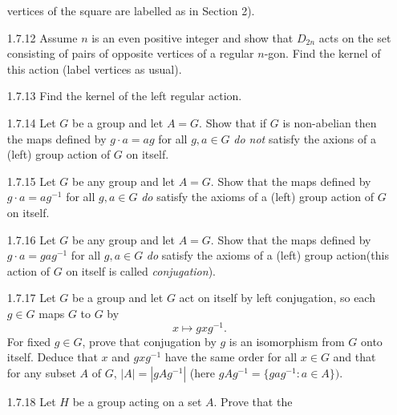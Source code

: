 \begin{enumerate}
                  vertices of the square are labelled as in Section 2).
   \item[1.7.12]  Assume $n$ is an even positive integer and show that $D_{2n}$
                  acts on the set consisting of pairs of opposite vertices of a
                  regular $n$-gon. Find the kernel of this action (label
                  vertices as usual).
   \item[1.7.13]  Find the kernel of the left regular action.
   \item[1.7.14]  Let $G$ be a group and let $A = G$. Show that if $G$ is
                  non-abelian then the maps defined by $g \cdot a = ag$ for all
                  $g, a \in G$ \textit{do not} satisfy the axions of a (left)
                  group action of $G$ on itself.
   \item[1.7.15]  Let $G$ be any group and let $A = G$. Show that the maps
                  defined by $g \cdot a = ag^{-1}$ for all $g, a \in G$
                  \textit{do} satisfy the axioms of a (left) group action of $G$
                  on itself.
   \item[1.7.16]  Let $G$ be any group and let $A = G$. Show that the maps
                  defined by $g \cdot a = gag^{-1}$ for all $g, a \in G$
                  \textit{do} satisfy the axioms of a (left) group action(this
                  action of $G$ on itself is called \textit{conjugation}).
   \item[1.7.17]  Let $G$ be a group and let $G$ act on itself by left 
                  conjugation, so each $g \in G$ maps $G$ to $G$ by
                  $$x \mapsto gxg^{-1}.$$
                  For fixed $g \in G$, prove that conjugation by $g$ is an
                  isomorphism from $G$ onto itself. Deduce that $x$ and
                  $gxg^{-1}$ have the same order for all $x \in G$ and that for
                  any subset $A$ of $G$, $|A| = |gAg^{-1}|$ (here
                  $gAg^{-1} = \{gag^{-1} : a \in A\})$.
   \item[1.7.18]  Let $H$ be a group acting on a set $A$. Prove that the

\end{enumerate}

